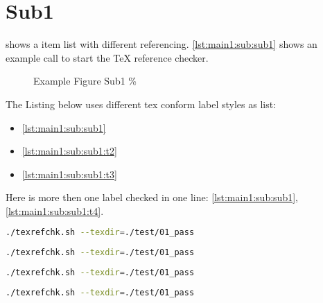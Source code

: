\section[Sub1]{Sub1}\label{main1:sub:sub1}

 shows a item list with different referencing. \autoref{lst:main1:sub:sub1} shows an example call to start the TeX reference checker.


\begin{figure}[!ht]
    \caption[{Main1; Sub; Sub1}]{Example Figure Sub1 \%}\label{fig:main1:sub:sub1}  %
\end{figure}


The Listing below uses different tex conform label styles as list:
\begin{itemize}
    \item \ref{lst:main1:sub:sub1}
    \item \ref{lst:main1:sub:sub1:t2}
    \item \ref{lst:main1:sub:sub1:t3}
\end{itemize}

Here is more then one label checked in one line: \ref{lst:main1:sub:sub1}, \ref{lst:main1:sub:sub1:t4}.


\begin{lstlisting}[language=bash,caption={Start texrefchk (Label Typ 1)}, label={lst:main1:sub:sub1}]
./texrefchk.sh --texdir=./test/01_pass
\end{lstlisting}


\begin{lstlisting}[language=bash, label = lst:main1:sub:sub1:t2, caption={Start texrefchk (Label Typ 2)}, ]
./texrefchk.sh --texdir=./test/01_pass
\end{lstlisting}


\begin{lstlisting}[language=bash, label=lst:main1:sub:sub1:t3, caption={Start texrefchk (Label Typ 3)}]
./texrefchk.sh --texdir=./test/01_pass
\end{lstlisting}


\begin{lstlisting}[language=bash, label= lst:main1:sub:sub1:t4, caption={Start texrefchk (Label Typ 4)}]
./texrefchk.sh --texdir=./test/01_pass
\end{lstlisting}



%
%
%
